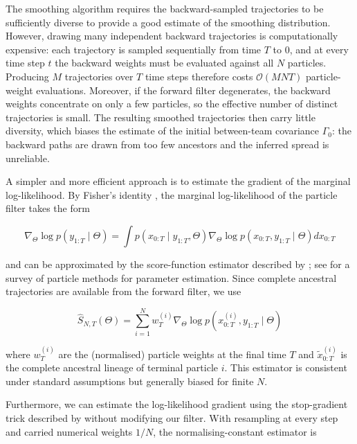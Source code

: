 The smoothing algorithm requires the backward-sampled trajectories to be sufficiently diverse to provide a good estimate of the smoothing distribution. However, drawing many independent backward trajectories is computationally expensive: each trajectory is sampled sequentially from time $T$ to $0$, and at every time step $t$ the backward weights must be evaluated against all $N$ particles. Producing $M$ trajectories over $T$ time steps therefore costs $\mathcal{O}(MNT)$ particle-weight evaluations. Moreover, if the forward filter degenerates, the backward weights concentrate on only a few particles, so the effective number of distinct trajectories is small. The resulting smoothed trajectories then carry little diversity, which biases the estimate of the initial between-team covariance $\Gamma_0$: the backward paths are drawn from too few ancestors and the inferred spread is unreliable. 

A simpler and more efficient approach is to estimate the gradient of the marginal log-likelihood. By Fisher's identity \citep{delmoral2004feynman,delmoraldoucetsingh2010forwardsmoothing}, the marginal log-likelihood of the particle filter takes the form

\begin{equation}\nabla_\Theta \log p(y_{1:T} \mid \Theta) = \int p(x_{0:T} \mid y_{1:T}, \Theta) \nabla_\Theta \log p(x_{0:T}, y_{1:T} \mid \Theta) dx_{0:T}\end{equation}

and can be approximated by the score-function estimator described by \citet{poyiadjisdoucetsingh2011particlescore}; see \citet{kantasetal2015particleparameter} for a survey of particle methods for parameter estimation. Since complete ancestral trajectories are available from the forward filter, we use

\begin{equation}
    \widehat{S}_{N,T}(\Theta) = \sum_{i=1}^N w_T^{(i)} \nabla_\Theta \log p(x_{0:T}^{(i)}, y_{1:T} \mid \Theta)
\end{equation}

where $w_T^{(i)}$ are the (normalised) particle weights at the final time $T$ and $\widetilde{x}_{0:T}^{(i)}$ is the complete ancestral lineage of terminal particle $i$. This estimator is consistent under standard assumptions but generally biased for finite $N$. 

Furthermore, we can estimate the log-likelihood gradient using the stop-gradient trick described by \citet{scibior2021differentiableparticlefiltering} without modifying our filter. With resampling at every step and carried numerical weights $1/N$, the normalising-constant estimator is


